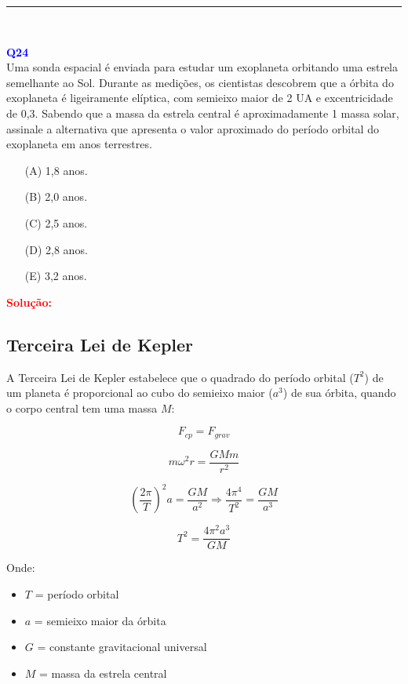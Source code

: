\documentclass[a4paper,12pt]{article}
\begin{document}
\noindent\rule{\linewidth}{0.6pt}\\

\begin{flushleft}
\textbf{\textcolor{blue}{\Large Q24}}\\

Uma sonda espacial é enviada para estudar um exoplaneta orbitando uma estrela semelhante ao
Sol. Durante as medições, os cientistas descobrem que a órbita do exoplaneta é
ligeiramente elíptica, com semieixo maior de 2 UA e excentricidade de 0{,}3. Sabendo que a massa da
estrela central é aproximadamente 1 massa solar, assinale a alternativa que apresenta o valor
aproximado do período orbital do exoplaneta em anos terrestres.

\begin{itemize}
\item[(A)] 1,8 anos.
\item[(B)] 2,0 anos.  
\item[(C)] 2,5 anos.
\item[(D)] 2,8 anos.
\item[(E)] 3,2 anos.
\end{itemize}

\vspace{0.5cm}

\textcolor{red}{\textbf{Solução:}}\\

\subsection*{Terceira Lei de Kepler}

A Terceira Lei de Kepler estabelece que o quadrado do período orbital (\(T^2\)) de um planeta é proporcional ao cubo do 
semieixo maior (\(a^3\)) de sua órbita, quando o corpo central tem uma massa \(M\):

\[
F_{cp} = F_{grav}
\]

\[
m\omega^2 r = \frac{GMm}{r^2}
\]

\[
\left(\frac{2\pi}{T}\right)^2 a = \frac{G M}{a^2} \Rightarrow \frac{4\pi^4}{T^{2}} = \frac{GM}{a^3}
\]

\[
\boxed{
T^2 = \frac{4\pi^2 a^3}{G M}
}
\]

Onde:

\begin{itemize}
    \item \( T \) = período orbital
    \item \( a \) = semieixo maior da órbita
    \item \( G \) = constante gravitacional universal
    \item \( M \) = massa da estrela central
\end{itemize}


\end{flushleft}
\end{document}
